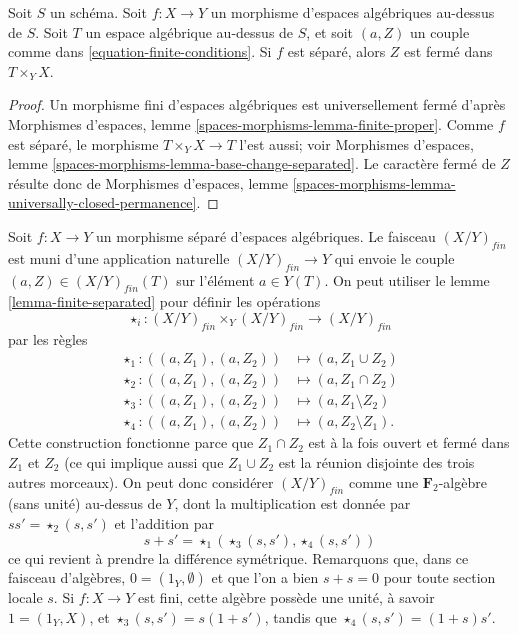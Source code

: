 \begin{lemma}
\label{lemma-finite-separated}
Soit $S$ un schéma.
Soit $f : X \to Y$ un morphisme d'espaces algébriques au-dessus de $S$.
Soit $T$ un espace algébrique au-dessus de $S$, et soit $(a, Z)$
un couple comme dans \ref{equation-finite-conditions}.
Si $f$ est séparé, alors $Z$ est fermé dans $T \times_Y X$.
\end{lemma}

\begin{proof}
Un morphisme fini d'espaces algébriques est universellement fermé d'après
Morphismes d'espaces, lemme \ref{spaces-morphisms-lemma-finite-proper}.
Comme $f$ est séparé, le morphisme $T \times_Y X \to T$ l'est aussi; voir
Morphismes d'espaces, lemme \ref{spaces-morphisms-lemma-base-change-separated}.
Le caractère fermé de $Z$ résulte donc de
Morphismes d'espaces,
lemme \ref{spaces-morphisms-lemma-universally-closed-permanence}.
\end{proof}

\begin{remark}
\label{remark-finite-monoid}
Soit $f : X \to Y$ un morphisme séparé d'espaces algébriques.
Le faisceau $(X/Y)_{fin}$ est muni d'une application naturelle
$(X/Y)_{fin} \to Y$ qui envoie le couple $(a, Z) \in (X/Y)_{fin}(T)$
sur l'élément $a \in Y(T)$. On peut utiliser le
lemme \ref{lemma-finite-separated}
pour définir les opérations
$$
\star_i : (X/Y)_{fin} \times_Y (X/Y)_{fin} \longrightarrow (X/Y)_{fin}
$$
par les règles
\begin{align*}
\star_1 : ((a, Z_1), (a, Z_2)) & \longmapsto (a, Z_1 \cup Z_2) \\
\star_2 : ((a, Z_1), (a, Z_2)) & \longmapsto (a, Z_1 \cap Z_2) \\
\star_3 : ((a, Z_1), (a, Z_2)) & \longmapsto (a, Z_1 \setminus Z_2) \\
\star_4 : ((a, Z_1), (a, Z_2)) & \longmapsto (a, Z_2 \setminus Z_1).
\end{align*}
Cette construction fonctionne parce que $Z_1 \cap Z_2$ est à la fois ouvert et fermé
dans $Z_1$ et $Z_2$ (ce qui implique aussi que $Z_1 \cup Z_2$ est
la réunion disjointe des trois autres morceaux).
On peut donc considérer $(X/Y)_{fin}$ comme une $\mathbf{F}_2$-algèbre
(sans unité) au-dessus de $Y$, dont la multiplication est donnée par
$ss' = \star_2(s, s')$ et l'addition par
$$
s + s' = \star_1(\star_3(s, s'), \star_4(s, s'))
$$
ce qui revient à prendre la différence symétrique.
Remarquons que, dans ce faisceau d'algèbres, $0 = (1_Y, \emptyset)$
et que l'on a bien $s + s = 0$ pour toute section locale $s$.
Si $f : X \to Y$ est fini, cette algèbre possède une unité, à savoir
$1 = (1_Y, X)$, et $\star_3(s, s') = s(1 + s')$, tandis que
$\star_4(s, s') = (1 + s)s'$.
\end{remark}

